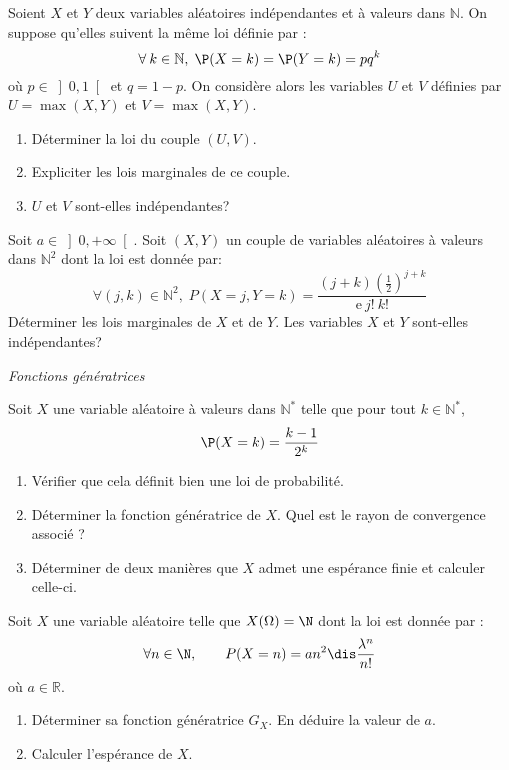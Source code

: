 \documentclass[a4paper,10pt]{report}
\begin{document}
\begin{Exa} Soient $X$ et $Y$ deux variables aléatoires indépendantes et à valeurs dans $\mathbb{N}$. On suppose qu'elles suivent la même loi définie par :
$$\forall\:k\in\mathbb{N}, \; \P(X=k)=\P(Y=k)=pq^k$$
où $p \in \left] 0,1\right[$ et $q=1-p$. On considère alors les variables $U$ et $V$ définies par $U=\max(X,Y)$ et $V=\max(X,Y)$.
\begin{enumerate}
\item
Déterminer la loi du couple $(U,V)$.
\item
Expliciter les lois marginales de ce couple.
\item
$U$ et $V$ sont-elles indépendantes?
\end{enumerate}
\end{Exa}


\begin{Exa} Soit $a\in {\left] 0,+\infty\right[ }$. Soit $(X,Y)$ un couple de variables aléatoires à valeurs dans $\mathbb{N}^2$ dont la loi est donnée par: 
$$\forall (j,k)\in {\mathbb{N}^2}, \; P(X=j,Y=k)=\dfrac{(j+k)\left( \tfrac{1}{2}\right) ^{j+k}}{\mathrm{e}\:j!\:k!}$$
Déterminer les lois marginales de $X$ et de $Y$. Les variables $X$ et $Y$ sont-elles indépendantes?
\end{Exa}

\newpage

\medskip

\begin{center}
\textit{{ {\large Fonctions génératrices}}}
\end{center}

\medskip

\begin{Exa}  Soit $X$ une variable aléatoire à valeurs dans $\mathbb{N}^*$ telle que pour tout $k \in \mathbb{N}^*$,
$$ \P(X=k) = \dfrac{k-1}{2^k}$$

\begin{enumerate}
\item Vérifier que cela définit bien une loi de probabilité.
\item Déterminer la fonction génératrice de $X$. Quel est le rayon de convergence associé ?
\item Déterminer de deux manières que $X$ admet une espérance finie et calculer celle-ci.
\end{enumerate}
\end{Exa}

\begin{Exa} Soit $X$ une variable al\'eatoire telle que $X(\Omega)=\N$ dont la loi est donnée par :
$$\forall n\in\N,\qquad P(X=n)=an^2\dis\frac{\lambda^n}{n!}$$
où $a \in \mathbb{R}$.
\begin{enumerate}
	\item D\'eterminer sa fonction g\'en\'eratrice $G_X.$ En d\'eduire la valeur de $a.$
	
	\item Calculer l'esp\'erance de $X.$
\end{enumerate}
\end{Exa}
\end{document}
